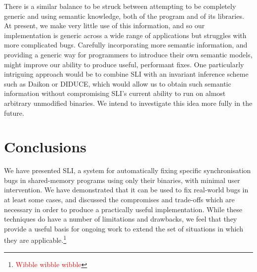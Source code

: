 \documentclass[10pt,twocolumn,preprint,natbib,authoryear]{sigplanconf}
\newcommand{\editorial}[1]{\textcolor{red}{\footnote{\textcolor{red}{#1}}}}
\begin{document}
There is a similar balance to be struck between attempting to be
completely generic and using semantic knowledge, both of the program
and of its libraries.  At present, we make very little use of this
information, and so our implementation is generic across a wide range
of applications but struggles with more complicated bugs.  Carefully
incorporating more semantic information, and providing a generic way
for programmers to introduce their own semantic models, might improve
our ability to produce useful, performant fixes.  One particularly
intriguing approach would be to combine SLI with an invariant
inference scheme such as Daikon\cite{Ernst2007} or
DIDUCE\cite{Hangal2002}, which would allow us to obtain such semantic
information without compromising SLI's current ability to run on
almost arbitrary unmodified binaries.  We intend to investigate this
idea more fully in the future.

\section{Conclusions}

We have presented SLI, a system for automatically fixing specific
synchronisation bugs in shared-memory programs using only their
binaries, with minimal user intervention.  We have demonstrated that
it can be used to fix real-world bugs in at least some cases, and
discussed the compromises and trade-offs which are necessary in order
to produce a practically useful implementation.  While these
techniques do have a number of limitations and drawbacks, we feel that
they provide a useful basis for ongoing work to extend the set of
situations in which they are applicable.\editorial{Wibble wibble
  wibble}




\end{document}

